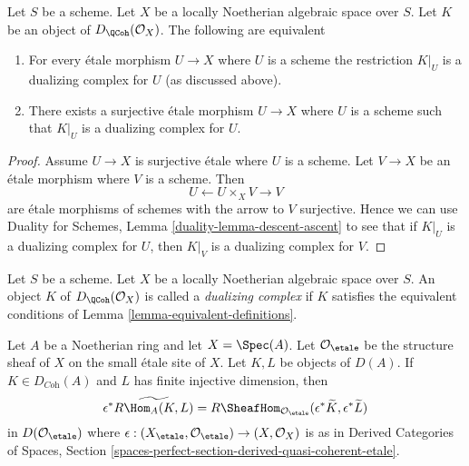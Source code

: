 \begin{lemma}
\label{lemma-equivalent-definitions}
Let $S$ be a scheme. Let $X$ be a locally Noetherian algebraic space over $S$.
Let $K$ be an object of $D_\QCoh(\mathcal{O}_X)$. The following are equivalent
\begin{enumerate}
\item For every \'etale morphism $U \to X$ where $U$ is a scheme
the restriction $K|_U$ is a dualizing complex for $U$ (as discussed above).
\item There exists a surjective \'etale morphism $U \to X$ where $U$ is a
scheme such that $K|_U$ is a dualizing complex for $U$.
\end{enumerate}
\end{lemma}

\begin{proof}
Assume $U \to X$ is surjective \'etale where $U$ is a scheme.
Let $V \to X$ be an \'etale morphism where $V$ is a scheme.
Then
$$
U \leftarrow U \times_X V \rightarrow V
$$
are \'etale morphisms of schemes with the arrow to $V$ surjective.
Hence we can use Duality for Schemes, Lemma \ref{duality-lemma-descent-ascent}
to see that if $K|_U$ is a dualizing complex for $U$, then
$K|_V$ is a dualizing complex for $V$.
\end{proof}

\begin{definition}
\label{definition-dualizing-scheme}
Let $S$ be a scheme.
Let $X$ be a locally Noetherian algebraic space over $S$.
An object $K$ of $D_\QCoh(\mathcal{O}_X)$ is called a
{\it dualizing complex} if $K$ satisfies the equivalent conditions of
Lemma \ref{lemma-equivalent-definitions}.
\end{definition}

\begin{lemma}
\label{lemma-affine-duality}
Let $A$ be a Noetherian ring and let $X = \Spec(A)$. Let
$\mathcal{O}_\etale$ be the structure sheaf of $X$ on the
small \'etale site of $X$. Let $K, L$ be objects of $D(A)$.
If $K \in D_{\textit{Coh}}(A)$ and $L$ has finite injective
dimension, then
$$
\epsilon^*\widetilde{R\Hom_A(K, L)} =
R\SheafHom_{\mathcal{O}_\etale}(\epsilon^*\widetilde{K},
\epsilon^*\widetilde{L})
$$
in $D(\mathcal{O}_\etale)$ where
$\epsilon : (X_\etale, \mathcal{O}_\etale) \to (X, \mathcal{O}_X)$
is as in Derived Categories of Spaces, Section
\ref{spaces-perfect-section-derived-quasi-coherent-etale}.
\end{lemma}

